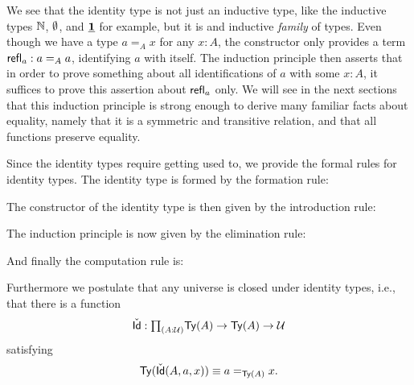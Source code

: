 \begin{rmk}
  We see that the identity type is not just an inductive type, like the inductive types $\N$, $\emptyt$, and $\unit$ for example, but it is and inductive \emph{family} of types. Even though we have a type $a=_A x$ for any $x:A$, the constructor only provides a term $\refl{a}:a=_A a$, identifying $a$ with itself. The induction principle then asserts that in order to prove something about all identifications of $a$ with some $x:A$, it suffices to prove this assertion about $\refl{a}$ only. We will see in the next sections that this induction principle is strong enough to derive many familiar facts about equality, namely that it is a symmetric and transitive relation, and that all functions preserve equality.
\end{rmk}

\begin{rmk}
  Since the identity types require getting used to, we provide the formal rules
  for identity types. The identity type is formed by the formation rule:
  \begin{prooftree}
  \end{prooftree}
  The constructor of the identity type is then given by the introduction rule:
  \begin{prooftree}
  \end{prooftree}
  The induction principle is now given by the elimination rule:
  \begin{prooftree}
  \end{prooftree}
  And finally the computation rule is:
  \begin{prooftree}
  \end{prooftree}
  Furthermore we postulate that any universe is closed under identity types, i.e., that there is a function
  \begin{equation*}
    \check{\mathsf{Id}}:\prd{A:\UU}\mathsf{Ty}(A)\to\mathsf{Ty}(A)\to\UU
  \end{equation*}
  satisfying
  \begin{equation*}
    \mathsf{Ty}(\check{\mathsf{Id}}(A,a,x))\jdeq a=_{\mathsf{Ty}(A)} x.
  \end{equation*}
\end{rmk}

